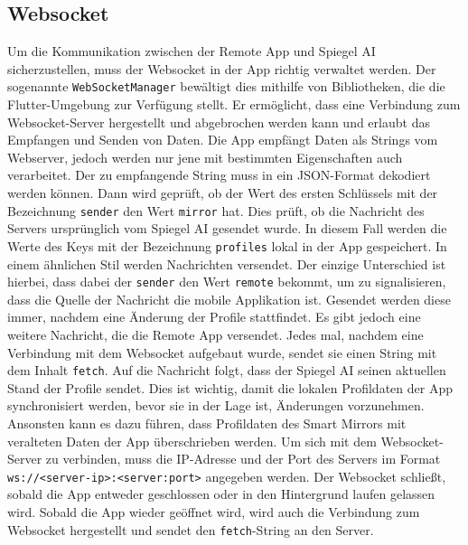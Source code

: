 \subsection{Websocket}
Um die Kommunikation zwischen der Remote App und Spiegel AI sicherzustellen, muss der Websocket in der App richtig verwaltet werden. Der sogenannte \texttt{WebSocketManager} bewältigt dies mithilfe von Bibliotheken, die die Flutter-Umgebung zur Verfügung stellt. Er ermöglicht, dass eine Verbindung zum Websocket-Server hergestellt und abgebrochen werden kann und erlaubt das Empfangen und Senden von Daten. Die App empfängt Daten als Strings vom Webserver, jedoch werden nur jene mit bestimmten Eigenschaften auch verarbeitet. Der zu empfangende String muss in ein JSON-Format dekodiert werden können. Dann wird geprüft, ob der Wert des ersten Schlüssels mit der Bezeichnung \texttt{sender} den Wert \texttt{mirror} hat. Dies prüft, ob die Nachricht des Servers ursprünglich vom Spiegel AI gesendet wurde. In diesem Fall werden die Werte des Keys mit der Bezeichnung \texttt{profiles} lokal in der App gespeichert. In einem ähnlichen Stil werden Nachrichten versendet. Der einzige Unterschied ist hierbei, dass dabei der \texttt{sender} den Wert \texttt{remote} bekommt, um zu signalisieren, dass die Quelle der Nachricht die mobile Applikation ist. Gesendet werden diese immer, nachdem eine Änderung der Profile stattfindet. Es gibt jedoch eine weitere Nachricht, die die Remote App versendet. Jedes mal, nachdem eine Verbindung mit dem Websocket aufgebaut wurde, sendet sie einen String mit dem Inhalt \texttt{fetch}. Auf die Nachricht folgt, dass der Spiegel AI seinen aktuellen Stand der Profile sendet. Dies ist wichtig, damit die lokalen Profildaten der App synchronisiert werden, bevor sie in der Lage ist, Änderungen vorzunehmen. Ansonsten kann es dazu führen, dass Profildaten des Smart Mirrors mit veralteten Daten der App überschrieben werden. Um sich mit dem Websocket-Server zu verbinden, muss die IP-Adresse und der Port des Servers im Format \texttt{ws://<server-ip>:<server:port>} angegeben werden. Der Websocket schließt, sobald die App entweder geschlossen oder in den Hintergrund laufen gelassen wird. Sobald die App wieder geöffnet wird, wird auch die Verbindung zum Websocket hergestellt und sendet den \texttt{fetch}-String an den Server. \\
